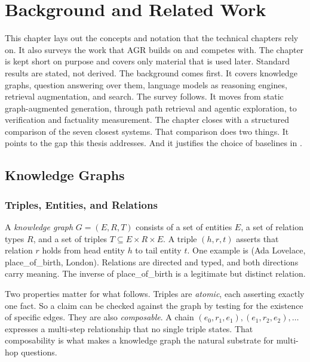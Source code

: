 \chapter{Background and Related Work}\label{ch:background}

This chapter lays out the concepts and notation that the technical chapters rely
on. It also surveys the work that AGR builds on and competes with. The chapter
is kept short on purpose and covers only material that is used later. Standard
results are stated, not derived. The background comes first. It covers knowledge
graphs, question answering over them, language models as reasoning engines,
retrieval augmentation, and search. The survey follows. It moves from static
graph-augmented generation, through path retrieval and agentic exploration, to
verification and factuality measurement. The chapter closes with a structured
comparison of the seven closest systems. That comparison does two things. It
points to the gap this thesis addresses. And it justifies the choice of
baselines in .

\section{Knowledge Graphs}\label{sec:kgs}

\subsection{Triples, Entities, and Relations}

A \emph{knowledge graph} $G = (E, R, T)$ consists of a set of entities $E$, a
set of relation types $R$, and a set of
triples $T \subseteq E \times R \times E$. A triple $(h, r, t)$
asserts that relation $r$ holds from head entity $h$ to tail entity $t$. One
example is \textsf{(Ada Lovelace, place\_of\_birth, London)}. Relations are
directed and typed, and both directions carry meaning. The inverse of
\textsf{place\_of\_birth} is a legitimate but distinct relation.

Two properties matter for what follows. Triples are \emph{atomic}, each
asserting exactly one fact. So a claim can be checked against the graph by
testing for the existence of specific edges. They are also \emph{composable}. A
chain $(e_0, r_1, e_1), (e_1, r_2, e_2), \dots$ expresses a multi-step
relationship that no single triple states. That composability is what makes a
knowledge graph the natural substrate for multi-hop questions.

